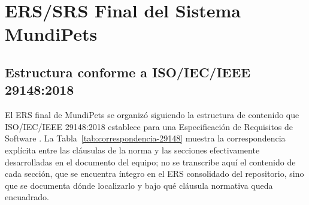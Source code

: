 \documentclass[journal,onecolumn]{IEEEtran}
\begin{document}

\section{ERS/SRS Final del Sistema MundiPets}
\label{sec:ers-final}

\subsection{Estructura conforme a ISO/IEC/IEEE 29148:2018}
\label{sec:estructura-29148}

El ERS final de MundiPets se organizó siguiendo la estructura de contenido que
ISO/IEC/IEEE 29148:2018 establece para una Especificación de Requisitos de
Software \cite{ieee29148}. La Tabla~\ref{tab:correspondencia-29148} muestra la
correspondencia explícita entre las cláusulas de la norma y las secciones
efectivamente desarrolladas en el documento del equipo; no se transcribe aquí
el contenido de cada sección, que se encuentra íntegro en el ERS consolidado
del repositorio, sino que se documenta dónde localizarlo y bajo qué cláusula
normativa queda encuadrado.
\end{document}
